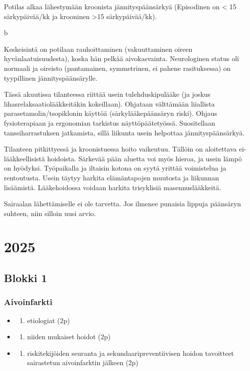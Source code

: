 \documentclass[
]{book}
\providecommand{\tightlist}{%
  \setlength{\itemsep}{0pt}\setlength{\parskip}{0pt}}
\begin{document}
Potilas alkaa lähestymään kroonista jännityspäänsärkyä (Episodinen on \textless{} 15 särkypäivää/kk ja krooninen \textgreater15 särkypäivää/kk).

b

Keskeisintä on potilaan rauhoittaminen (vakuuttaminen oireen hyvänlaatuisuudesta), koska hän pelkää aivokasvainta. Neurologinen status oli normaali ja oireisto (pantamainen, symmetrinen, ei pahene rasituksessa) on tyypillinen jännityspäänsärylle.

Tässä akuutissa tilanteessa riittää usein tulehduskipulääke (ja joskus lihasrelaksaatiolääkkeitäkin kokeillaan). Ohjataan välttämään liiallista parasetamolin/tsopiklonin käyttöä (särkylääkepäänsäryn riski). Ohjaus fysioterapiaan ja ergonomian tarkistus näyttöpäätetyössä. Suositellaan tanssiharrastuksen jatkamista, sillä liikunta usein helpottaa jännityspäänsärkyä.

Tilanteen pitkittyessä ja kroonistuessa hoito vaikeutuu. Tällöin on aloitettava ei-lääkkeellisistä hoidoista. Särkevää pään aluetta voi myös hieroa, ja usein lämpö on hyödyksi. Työpaikalla ja iltaisin kotona on syytä yrittää voimistelua ja rentoutusta. Usein täytyy harkita elämäntapojen muutosta ja liikunnan lisäämistä. Lääkehoidossa voidaan harkita trisyklisiä masennuslääkkeitä.

Sairaalan lähettämiselle ei ole tarvetta. Jos ilmenee punaisia lippuja päänsäryn suhteen, niin silloin uusi arvio.

\chapter{2025}\label{section-1}

\section{Blokki 1}\label{blokki-1-1}

\subsection{Aivoinfarkti}\label{aivoinfarkti}

\begin{itemize}
\tightlist
\item
  \begin{enumerate}
  \def\labelenumi{\alph{enumi}.}
  \tightlist
  \item
    etiologiat (2p)
  \end{enumerate}
\item
  \begin{enumerate}
  \def\labelenumi{\alph{enumi}.}
  \setcounter{enumi}{1}
  \tightlist
  \item
    niiden mukaiset hoidot (2p)
  \end{enumerate}
\item
  \begin{enumerate}
  \def\labelenumi{\alph{enumi}.}
  \setcounter{enumi}{2}
  \tightlist
  \item
    riskitekijöiden seuranta ja sekundaaripreventiivisen hoidon tavoitteet sairastetun aivoinfarktin jälkeen (2p)
  \end{enumerate}
\end{itemize}
\end{document}
